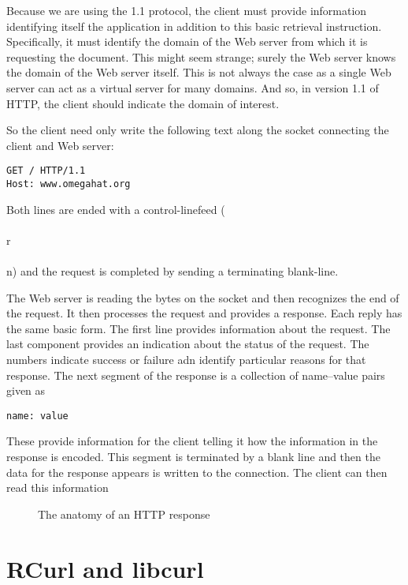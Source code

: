 \documentclass{article}
\begin{document}
Because we are using the 1.1 protocol, the client must provide
information identifying itself the application in addition to this
basic retrieval instruction.  Specifically, it must identify the
domain of the Web server from which it is requesting the document.
This might seem strange; surely the Web server knows the domain of the
Web server itself.  This is not always the case as a single Web server
can act as a virtual server for many domains.  And so, in version 1.1
of HTTP, the client should indicate the domain of interest.

So the client need only write the following text 
along the socket connecting the client and Web server:
\begin{verbatim}
GET / HTTP/1.1
Host: www.omegahat.org
\end{verbatim}
Both lines are ended with a control-linefeed (\\\\r\\\\n) and the
request is completed by sending a terminating blank-line.  

The Web server is reading the bytes on the socket and then recognizes
the end of the request.  It then processes the request and provides a
response. Each reply has the same basic form.
The first line provides information about the
request.  The last component provides an indication
about the status of the request.
The numbers indicate  success
or failure adn identify particular
reasons for that response.
The next segment of the response
is a collection of name--value pairs
given as 
\begin{verbatim}
name: value
\end{verbatim}
These provide information for the client
telling it how the information 
in the response is encoded.
This segment is terminated by a blank line
and then the data for the response appears
is written to the connection.
The client can then read  this information
\begin{figure}[htbp]
  \begin{center}
    \leavevmode
    
    \caption{The anatomy of an HTTP response}
    \label{fig:HTTPResponse}
  \end{center}
\end{figure}




\section{RCurl and libcurl}\label{RCurlBasics}
\end{document}
